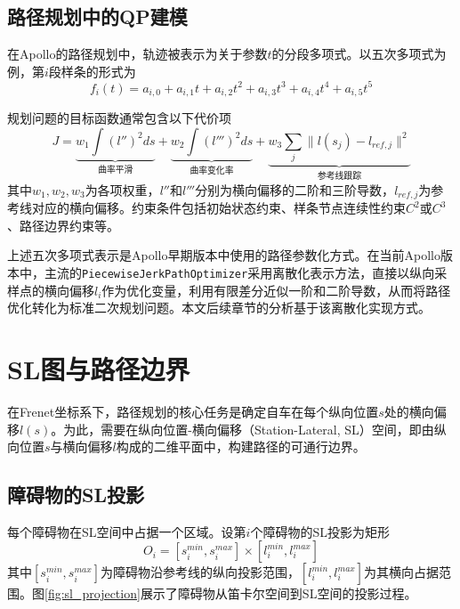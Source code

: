 \subsection{路径规划中的QP建模}

在Apollo的路径规划中，轨迹被表示为关于参数$t$的分段多项式。以五次多项式为例，第$i$段样条的形式为
\begin{equation}
f_i(t) = a_{i,0} + a_{i,1}t + a_{i,2}t^2 + a_{i,3}t^3 + a_{i,4}t^4 + a_{i,5}t^5
\label{eq:quintic_poly}
\end{equation}

规划问题的目标函数通常包含以下代价项
\begin{equation}
J = \underbrace{w_1 \int (l'')^2 ds}_{\text{曲率平滑}} + \underbrace{w_2 \int (l''')^2 ds}_{\text{曲率变化率}} + \underbrace{w_3 \sum_j \| l(s_j) - l_{ref,j} \|^2}_{\text{参考线跟踪}}
\label{eq:path_cost}
\end{equation}
其中$w_1, w_2, w_3$为各项权重，$l''$和$l'''$分别为横向偏移的二阶和三阶导数，$l_{ref,j}$为参考线对应的横向偏移。约束条件包括初始状态约束、样条节点连续性约束$C^2$或$C^3$、路径边界约束等。

上述五次多项式表示是Apollo早期版本中使用的路径参数化方式。在当前Apollo版本中，主流的\texttt{PiecewiseJerkPathOptimizer}采用离散化表示方法，直接以纵向采样点的横向偏移$l_i$作为优化变量，利用有限差分近似一阶和二阶导数，从而将路径优化转化为标准二次规划问题。本文后续章节的分析基于该离散化实现方式。

\section{SL图与路径边界}

在Frenet坐标系下，路径规划的核心任务是确定自车在每个纵向位置$s$处的横向偏移$l(s)$。为此，需要在纵向位置-横向偏移（Station-Lateral, SL）空间，即由纵向位置$s$与横向偏移$l$构成的二维平面中，构建路径的可通行边界。

\subsection{障碍物的SL投影}

每个障碍物在SL空间中占据一个区域。设第$i$个障碍物的SL投影为矩形
\begin{equation}
O_i = [s_i^{min}, s_i^{max}] \times [l_i^{min}, l_i^{max}]
\end{equation}
其中$[s_i^{min}, s_i^{max}]$为障碍物沿参考线的纵向投影范围，$[l_i^{min}, l_i^{max}]$为其横向占据范围。图\ref{fig:sl_projection}展示了障碍物从笛卡尔空间到SL空间的投影过程。

